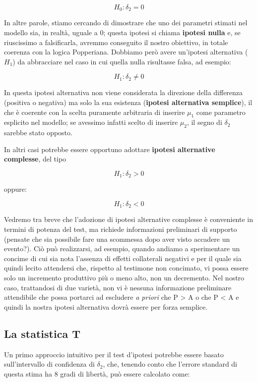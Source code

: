 \documentclass[a4paper,12pt,oneside]{book}
\begin{document}
\[H_0: \delta_2 = 0\]

In altre parole, stiamo cercando di dimostrare che uno dei parametri stimati nel modello sia, in realtà, uguale a 0; questa ipotesi si chiama \textbf{ipotesi nulla} e, se riuscissimo a falsificarla, avremmo conseguito il nostro obiettivo, in totale coerenza con la logica Popperiana. Dobbiamo però avere un'ipotesi alternativa (\(H_1\)) da abbracciare nel caso in cui quella nulla risultasse falsa, ad esempio:

\[H_1: \delta_2 \neq 0\]

In questa ipotesi alternativa non viene considerata la direzione della differenza (positiva o negativa) ma solo la sua esistenza (\textbf{ipotesi alternativa semplice}), il che è coerente con la scelta puramente arbitraria di inserire \(\mu_1\) come parametro esplicito nel modello; se avessimo infatti scelto di inserire \(\mu_2\), il segno di \(\delta_2\) sarebbe stato opposto.

In altri casi potrebbe essere opportuno adottare \textbf{ipotesi alternative complesse}, del tipo

\[H_1 :\delta_2  > 0\]

oppure:

\[H_1 :\delta_2  < 0\]

Vedremo tra breve che l'adozione di ipotesi alternative complesse è conveniente in termini di potenza del test, ma richiede informazioni preliminari di supporto (pensate che sia possibile fare una scommessa dopo aver visto accadere un evento?). Ciò può realizzarsi, ad esempio, quando andiamo a sperimentare un concime di cui sia nota l'assenza di effetti collaterali negativi e per il quale sia quindi lecito attendersi che, rispetto al testimone non concimato, vi possa essere solo un incremento produttivo più o meno alto, non un decremento. Nel nostro caso, trattandosi di due varietà, non vi è nessuna informazione preliminare attendibile che possa portarci ad escludere \emph{a priori} che P \textgreater{} A o che P \textless{} A e quindi la nostra ipotesi alternativa dovrà essere per forza semplice.

\hypertarget{la-statistica-t}{%
\subsection{La statistica T}\label{la-statistica-t}}

Un primo approccio intuitivo per il test d'ipotesi potrebbe essere basato sull'intervallo di confidenza di \(\delta_2\), che, tenendo conto che l'errore standard di questa stima ha 8 gradi di libertà, può essere calcolato come:
\end{document}
